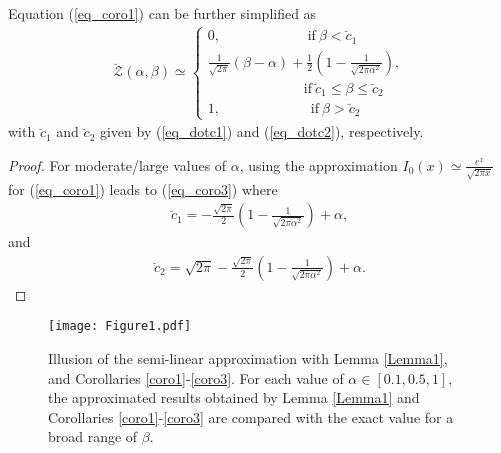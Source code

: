 \begin{corollary}\label{coro3}
Equation (\ref{eq_coro1}) can be further simplified as
\begin{align}\label{eq_coro3}
\breve{\mathcal{Z}}(\alpha,\beta)\simeq
\begin{cases}
0, ~~~~~~~~~~~~~~~~~~~~~~~~~~~~\mathrm{if}~  \beta < \breve{c}_1  \\ 
\frac{1}{\sqrt{2\pi}}(\beta-\alpha) + 
\frac{1}{2}\left(1-\frac{1}{\sqrt{2\pi\alpha^2}}\right), \\~~~~~~~~~~~~~~~~~~~~~~~~~~~~~~~\mathrm{if}~  \breve{c}_1 \leq\beta\leq \breve{c}_2 \\
1, ~~~~~~~~~~~~~~~~~~~~~~~~~~~~~\mathrm{if}~ \beta>\breve{c}_2
\end{cases}
\end{align}
with $\breve{c}_1$ and $\breve{c}_2$ given by (\ref{eq_dotc1}) and (\ref{eq_dotc2}), respectively.
\end{corollary}
\begin{proof}
For moderate/large values of $\alpha$, using the approximation $I_0(x) \simeq \frac{e^x}{\sqrt{2\pi x}}$ for (\ref{eq_coro1}) leads to (\ref{eq_coro3}) where
\begin{align}\label{eq_dotc1}
        \breve{c}_1 = -\frac{\sqrt{2\pi}}{2}\left(1-\frac{1}{\sqrt{2\pi\alpha^2}}\right)+\alpha,
\end{align}
and
\begin{align}\label{eq_dotc2}
     \breve{c}_2 = \sqrt{2\pi}-\frac{\sqrt{2\pi}}{2}\left(1-\frac{1}{\sqrt{2\pi\alpha^2}}\right)+\alpha.
\end{align}
\end{proof}










\begin{figure}
\centering
  \texttt{[image: Figure1.pdf]}\\
\caption{Illusion of the semi-linear approximation with Lemma \ref{Lemma1}, and Corollaries \ref{coro1}-\ref{coro3}. For each value of $\alpha\in[0.1,0.5,1]$, the approximated results obtained by Lemma \ref{Lemma1} and Corollaries \ref{coro1}-\ref{coro3} are compared with the exact value for a broad range of $\beta$.}
\label{fig_largealpha}
\end{figure}




